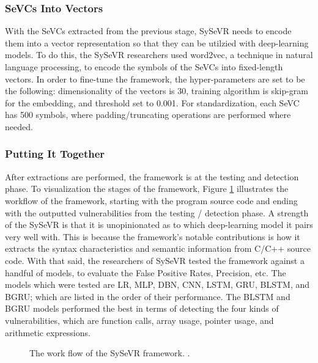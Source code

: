 \documentclass[12pt,twocolumn,letterpaper]{article}
\begin{document}
\subsubsection{SeVCs Into Vectors}
With the SeVCs extracted from the previous stage, SySeVR needs to encode them into a vector representation so that they can be
utilzied with deep-learning models. To do this, the SySeVR researchers used word2vec, a technique in natural language processing, to encode the symbols of
the SeVCs into fixed-length vectors. In order to fine-tune the framework, the hyper-parameters are set to be the following: dimensionality of the vectors is 30,
training algorithm is skip-gram for the embedding, and threshold set to 0.001. For standardization, each SeVC has 500 symbols, where padding/truncating operations are
performed where needed.

\subsubsection{Putting It Together}
After extractions are performed, the framework is at the testing and detection phase. To visualization the stages of the
framework, Figure \ref{fig:sys-3} illustrates the workflow of the framework, starting with the program source code and ending with the outputted vulnerabilities
from the testing / detection phase. A strength of the SySeVR is that it is unopinionated as to which deep-learning model it pairs very well with.
This is because the framework's notable contributions is how it extracts the syntax characteristics and semantic information from C/C++ source code.
With that said, the researchers of SySeVR tested the framework against a handful of models, to evaluate
the False Positive Rates, Precision, etc. The models which were tested are LR, MLP, DBN, CNN, LSTM, GRU, BLSTM, and BGRU; which are listed in
the order of their performance. The BLSTM and BGRU models performed the best in terms of detecting the four kinds of vulnerabilities, which are
function calls, array usage, pointer usage, and arithmetic expressions.

\begin{figure}[h!]
    \centering
    \caption{The work flow of the SySeVR framework. \cite{Li22}.}
    \label{fig:sys-3}
\end{figure}
\end{document}
